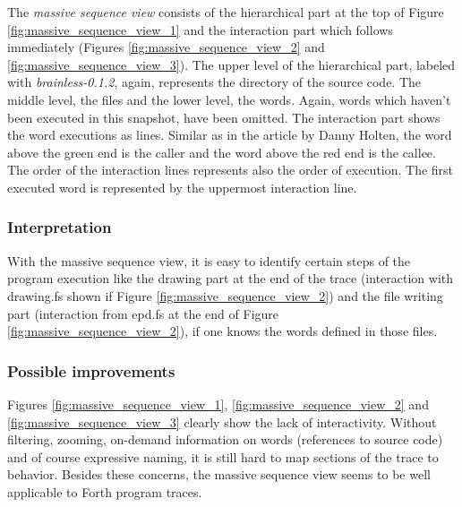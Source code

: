 The \emph{massive sequence view} consists of the hierarchical part at the top of Figure \ref{fig:massive_sequence_view_1} and the interaction part which follows immediately (Figures \ref{fig:massive_sequence_view_2} and \ref{fig:massive_sequence_view_3}). The upper level of the hierarchical part, labeled with \emph{brainless-0.1.2}, again, represents the directory of the source code. The middle level, the files and the lower level, the words. Again, words which haven't been executed in this snapshot, have been omitted.
The interaction part shows the word executions as lines. Similar as in the article by Danny Holten\cite{Holten:2006:HEB:1187627.1187772}, the word above the green end is the caller and the word above the red end is the callee. The order of the interaction lines represents also the order of execution. The first executed word is represented by the uppermost interaction line.

\subsubsection*{Interpretation}

With the massive sequence view, it is easy to identify certain steps of the program execution like the drawing part at the end of the trace (interaction with drawing.fs shown if Figure \ref{fig:massive_sequence_view_2}) and the file writing part (interaction from epd.fs at the end of Figure \ref{fig:massive_sequence_view_2}), if one knows the words defined in those files.

\subsubsection*{Possible improvements}

Figures \ref{fig:massive_sequence_view_1}, \ref{fig:massive_sequence_view_2} and \ref{fig:massive_sequence_view_3} clearly show the lack of interactivity. Without filtering, zooming, on-demand information on words (references to source code) and of course expressive naming, it is still hard to map sections of the trace to behavior. Besides these concerns, the massive sequence view seems to be well applicable to Forth program traces.

